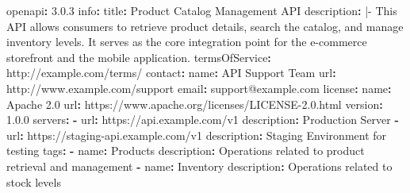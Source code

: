 \documentclass[
  11pt,
  openany,
  oneside]{book}
\newenvironment{Shaded}{}{}
\newcommand{\AttributeTok}[1]{\textcolor[rgb]{0.49,0.56,0.16}{#1}}
\newcommand{\CharTok}[1]{\textcolor[rgb]{0.25,0.44,0.63}{#1}}
\newcommand{\FloatTok}[1]{\textcolor[rgb]{0.25,0.63,0.44}{#1}}
\newcommand{\FunctionTok}[1]{\textcolor[rgb]{0.02,0.16,0.49}{#1}}
\newcommand{\KeywordTok}[1]{\textcolor[rgb]{0.00,0.44,0.13}{\textbf{#1}}}
\newcommand{\NormalTok}[1]{#1}
\begin{document}
\begin{Shaded}
\begin{Highlighting}[]
\FunctionTok{openapi}\KeywordTok{:}\AttributeTok{ }\FloatTok{3.0.3}
\FunctionTok{info}\KeywordTok{:}
\AttributeTok{  }\FunctionTok{title}\KeywordTok{:}\AttributeTok{ Product Catalog Management API}
\FunctionTok{  description}\KeywordTok{: }\CharTok{|{-}}
\NormalTok{    This API allows consumers to retrieve product details, search the catalog, and manage inventory levels.}
\NormalTok{    It serves as the core integration point for the e{-}commerce storefront and the mobile application.}
\AttributeTok{  }\FunctionTok{termsOfService}\KeywordTok{:}\AttributeTok{ http://example.com/terms/}
\AttributeTok{  }\FunctionTok{contact}\KeywordTok{:}
\AttributeTok{    }\FunctionTok{name}\KeywordTok{:}\AttributeTok{ API Support Team}
\AttributeTok{    }\FunctionTok{url}\KeywordTok{:}\AttributeTok{ http://www.example.com/support}
\AttributeTok{    }\FunctionTok{email}\KeywordTok{:}\AttributeTok{ support@example.com}
\AttributeTok{  }\FunctionTok{license}\KeywordTok{:}
\AttributeTok{    }\FunctionTok{name}\KeywordTok{:}\AttributeTok{ Apache 2.0}
\AttributeTok{    }\FunctionTok{url}\KeywordTok{:}\AttributeTok{ https://www.apache.org/licenses/LICENSE{-}2.0.html}
\AttributeTok{  }\FunctionTok{version}\KeywordTok{:}\AttributeTok{ }\FloatTok{1.0.0}
\FunctionTok{servers}\KeywordTok{:}
\AttributeTok{  }\KeywordTok{{-}}\AttributeTok{ }\FunctionTok{url}\KeywordTok{:}\AttributeTok{ https://api.example.com/v1}
\AttributeTok{    }\FunctionTok{description}\KeywordTok{:}\AttributeTok{ Production Server}
\AttributeTok{  }\KeywordTok{{-}}\AttributeTok{ }\FunctionTok{url}\KeywordTok{:}\AttributeTok{ https://staging{-}api.example.com/v1}
\AttributeTok{    }\FunctionTok{description}\KeywordTok{:}\AttributeTok{ Staging Environment for testing}
\FunctionTok{tags}\KeywordTok{:}
\AttributeTok{  }\KeywordTok{{-}}\AttributeTok{ }\FunctionTok{name}\KeywordTok{:}\AttributeTok{ Products}
\AttributeTok{    }\FunctionTok{description}\KeywordTok{:}\AttributeTok{ Operations related to product retrieval and management}
\AttributeTok{  }\KeywordTok{{-}}\AttributeTok{ }\FunctionTok{name}\KeywordTok{:}\AttributeTok{ Inventory}
\AttributeTok{    }\FunctionTok{description}\KeywordTok{:}\AttributeTok{ Operations related to stock levels}


\end{Highlighting}
\end{Shaded}
\end{document}
